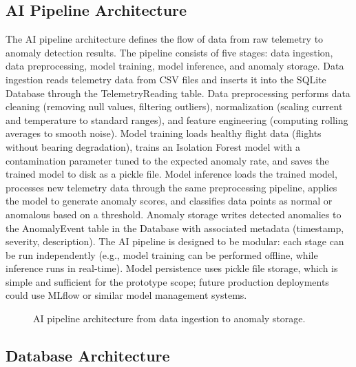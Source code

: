 \subsection{AI Pipeline Architecture}

The AI pipeline architecture defines the flow of data from raw telemetry to anomaly detection results. The pipeline consists of five stages: data ingestion, data preprocessing, model training, model inference, and anomaly storage. Data ingestion reads telemetry data from CSV files and inserts it into the SQLite Database through the TelemetryReading table. Data preprocessing performs data cleaning (removing null values, filtering outliers), normalization (scaling current and temperature to standard ranges), and feature engineering (computing rolling averages to smooth noise). Model training loads healthy flight data (flights without bearing degradation), trains an Isolation Forest model with a contamination parameter tuned to the expected anomaly rate, and saves the trained model to disk as a pickle file. Model inference loads the trained model, processes new telemetry data through the same preprocessing pipeline, applies the model to generate anomaly scores, and classifies data points as normal or anomalous based on a threshold. Anomaly storage writes detected anomalies to the AnomalyEvent table in the Database with associated metadata (timestamp, severity, description). The AI pipeline is designed to be modular: each stage can be run independently (e.g., model training can be performed offline, while inference runs in real-time). Model persistence uses pickle file storage, which is simple and sufficient for the prototype scope; future production deployments could use MLflow or similar model management systems.

\begin{figure}[H]
\centering
\caption{AI pipeline architecture from data ingestion to anomaly storage.}
\label{fig:ai_pipeline}
\end{figure}

\subsection{Database Architecture}

